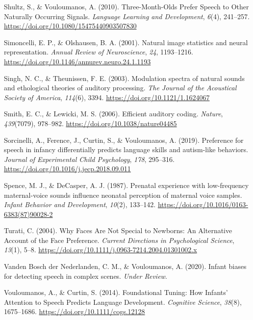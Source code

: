 \documentclass[
  man]{apa6}
\begin{document}
\leavevmode\hypertarget{ref-shultz_three-month-olds_2010}{}%
Shultz, S., \& Vouloumanos, A. (2010). Three-Month-Olds Prefer Speech to Other Naturally Occurring Signals. \emph{Language Learning and Development}, \emph{6}(4), 241--257. \url{https://doi.org/10.1080/15475440903507830}

\leavevmode\hypertarget{ref-simoncelli_natural_2001}{}%
Simoncelli, E. P., \& Olshausen, B. A. (2001). Natural image statistics and neural representation. \emph{Annual Review of Neuroscience}, \emph{24}, 1193--1216. \url{https://doi.org/10.1146/annurev.neuro.24.1.1193}

\leavevmode\hypertarget{ref-singh_modulation_2003}{}%
Singh, N. C., \& Theunissen, F. E. (2003). Modulation spectra of natural sounds and ethological theories of auditory processing. \emph{The Journal of the Acoustical Society of America}, \emph{114}(6), 3394. \url{https://doi.org/10.1121/1.1624067}

\leavevmode\hypertarget{ref-smith_efficient_2006}{}%
Smith, E. C., \& Lewicki, M. S. (2006). Efficient auditory coding. \emph{Nature}, \emph{439}(7079), 978--982. \url{https://doi.org/10.1038/nature04485}

\leavevmode\hypertarget{ref-sorcinelli_preference_2019}{}%
Sorcinelli, A., Ference, J., Curtin, S., \& Vouloumanos, A. (2019). Preference for speech in infancy differentially predicts language skills and autism-like behaviors. \emph{Journal of Experimental Child Psychology}, \emph{178}, 295--316. \url{https://doi.org/10.1016/j.jecp.2018.09.011}

\leavevmode\hypertarget{ref-spence_prenatal_1987}{}%
Spence, M. J., \& DeCasper, A. J. (1987). Prenatal experience with low-frequency maternal-voice sounds influence neonatal perception of maternal voice samples. \emph{Infant Behavior and Development}, \emph{10}(2), 133--142. \url{https://doi.org/10.1016/0163-6383(87)90028-2}

\leavevmode\hypertarget{ref-turati_why_2004}{}%
Turati, C. (2004). Why Faces Are Not Special to Newborns: An Alternative Account of the Face Preference. \emph{Current Directions in Psychological Science}, \emph{13}(1), 5--8. \url{https://doi.org/10.1111/j.0963-7214.2004.01301002.x}

\leavevmode\hypertarget{ref-vanden_bosch_der_nederlanden_infant_2020}{}%
Vanden Bosch der Nederlanden, C. M., \& Vouloumanos, A. (2020). Infant biases for detecting speech in complex scenes. \emph{Under Review}.

\leavevmode\hypertarget{ref-vouloumanos_foundational_2014}{}%
Vouloumanos, A., \& Curtin, S. (2014). Foundational Tuning: How Infants' Attention to Speech Predicts Language Development. \emph{Cognitive Science}, \emph{38}(8), 1675--1686. \url{https://doi.org/10.1111/cogs.12128}
\end{document}
